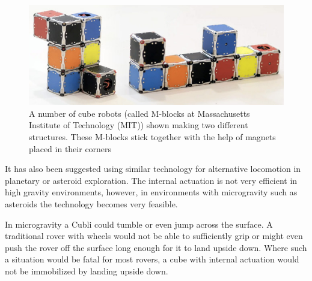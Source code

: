 \begin{figure}[H] 
	\centering
	\includegraphics[scale=0.4]{figures/m-blocks}
	\caption{A number of cube robots (called M-blocks at Massachusetts Institute of Technology (MIT)) shown making two different structures. These M-blocks stick together with the help of magnets placed in their corners \cite{LRosen}}
	\label{MBlocksExample}
\end{figure}
%
It has also been suggested using similar technology for alternative locomotion in planetary or asteroid exploration. The internal actuation is not very efficient in high gravity environments, however, in environments with microgravity such as asteroids the technology becomes very feasible. \cite{RAllen}

In microgravity a Cubli could tumble or even jump across the surface. A traditional rover with wheels would not be able to sufficiently grip or might even push the rover off the surface long enough for it to land upside down. Where such a situation would be fatal for most rovers, a cube with internal actuation would not be immobilized by landing upside down. \cite{ELandau}

